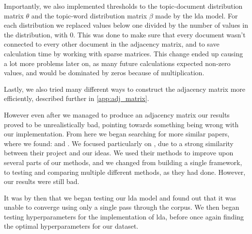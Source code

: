 Importantly, we also implemented thresholds to the topic-document distribution matrix $\theta$ and the topic-word distribution matrix $\beta$ made by the \gls{lda} model.
For each distribution we replaced values below one divided by the number of values in the distribution, with 0.
This was done to make sure that every document wasn't connected to every other document in the adjacency matrix, and to save calculation time by working with sparse matrices.
This change ended up causing a lot more problems later on, as many future calculations expected non-zero values, and would be dominated by zeros because of multiplication.

Lastly, we also tried many different ways to construct the adjacency matrix more efficiently, described further in \autoref{app:adj_matrix}.

However even after we managed to produce an adjacency matrix our results proved to be unrealistically bad, pointing towards something being wrong with our implementation.
From here we began searching for more similar papers, where we found: \citeauthor{yang2009topic}\cite{yang2009topic} and \citeauthor{Tang2008}\cite{Tang2008}.
We focused particularly on \citeauthor{yang2009topic}, due to a strong similarity between their project and our ideas.
We used their methods to improve upon several parts of our methods, and we changed from building a single framework, to testing and comparing multiple different methods, as they had done.
However, our results were still bad.

It was by then that we began testing our \gls{lda} model and found out that it was unable to converge using only a single pass through the corpus. 
We then began testing hyperparameters for the implementation of \gls{lda}, before once again finding the optimal hyperparameters for our dataset.
